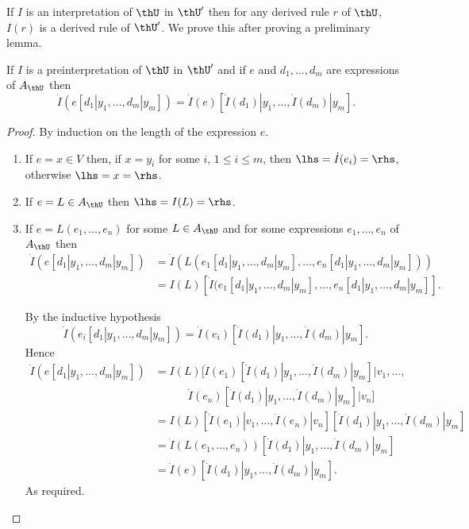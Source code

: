 If $I$ is an interpretation of $\thU$ in $\thU'$ then for any derived rule $r$ of $\thU$, $I(r)$  is a derived rule of $\thU'$.
%
We prove this after proving a preliminary lemma.

\begin{lemma}[1]
  If $I$ is a preinterpretation of $\thU$ in $\thU'$ and if $e$ and $d_1,\ldots,d_m$ are expressions of $A_\thU$ then
  \[
    \dot I(e[d_1|y_1,\ldots,d_m|y_m]) = \dot I(e)[\dot I(d_1)|y_1,\ldots,\dot I(d_m)|y_m].
  \]
\end{lemma}
\begin{proof} By induction on the length of the expression $e$.

  \begin{enumerate}
    \item If $e=x\in V$ then, if $x = y_i$ for some $i$, $1\leq i\leq m$, then $\lhs = \dot I(e_i) = \rhs$, otherwise $\lhs = x = \rhs$.

    \item If $e = L\in A_\thU$ then $\lhs = I(L) = \rhs$.

    \item If $e = L(e_1,\ldots,e_n)$ for some $L\in A_\thU$ and for some expressions $e_1,\ldots,e_n$ of $A_\thU$ then
      \begin{align*}
        \dot I(e[d_1|y_1,\ldots,d_m|y_m])
        &= \dot I(L(e_1[d_1|y_1,\ldots,d_m|y_m],\ldots,e_n[d_1|y_1,\ldots,d_m|y_m])) \\
        &= I(L)[\dot I(e_1[d_1|y_1,\ldots,d_m|y_m],\ldots,e_n[d_1|y_1,\ldots,d_m|y_m]].
        \end{align*}

        By the inductive hypothesis
        \[\dot I(e_i[d_1|y_1,\ldots,d_m|y_m]) = \dot I(e_i)[\dot I(d_1)|y_1,\ldots,\dot I(d_m)|y_m].\]
        Hence
        \begin{align*}
          \dot I(e[d_1|y_1,\ldots,d_m|y_m])
          &= I(L)[\dot I(e_1)[\dot I(d_1)|y_1,\ldots,\dot I(d_m)|y_m]|v_1,\ldots,\\
          &\qquad\quad\dot I(e_n)[\dot I(d_1)|y_1,\ldots,\dot I(d_m)|y_m]|v_n]\\
          &= I(L)[\dot I(e_1)|v_1,\ldots,\dot I(e_n)|v_n][\dot I(d_1)|y_1,\ldots,\dot I(d_m)|y_m]\\
          &= \dot I(L(e_1,\ldots,e_n))[\dot I(d_1)|y_1,\ldots,\dot I(d_m)|y_m]\\
          &= \dot I(e)[\dot I(d_1)|y_1,\ldots,\dot I(d_m)|y_m].
        \end{align*}
        As required.
    \end{enumerate}
  \end{proof}

